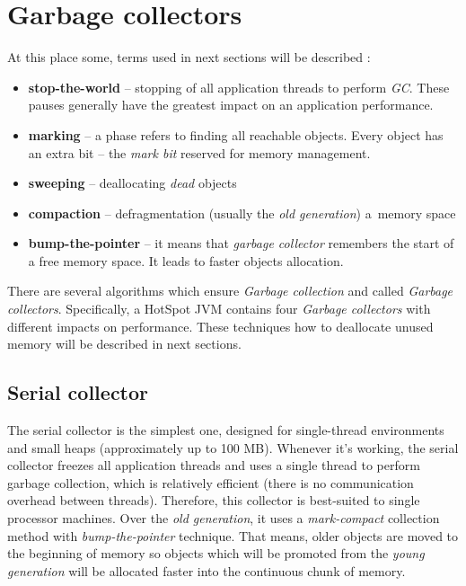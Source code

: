 \documentclass[
  digital, %
  oneside,
  notable, %
  nolof,     %
  nolot     %
]{fithesis3}
\begin{document}
\section{Garbage collectors}
At this place some, terms used in next sections will be described \cite{scott} \cite{hunt}:
\begin{itemize}
	\item \textbf{stop-the-world} -- stopping of all application threads to perform \textit{GC}. These pauses generally have the greatest impact on an application performance.
	\item \textbf{marking} -- a phase refers to finding all reachable objects. Every object has an extra bit -- the \textit{mark bit} reserved for memory management.
	\item \textbf{sweeping} -- deallocating \textit{dead} objects
	\item \textbf{compaction} -- defragmentation (usually the \textit{old generation}) a~memory space
	\item \textbf{bump-the-pointer} -- it means that \textit{garbage collector} remembers the start of a free memory space. It leads to faster objects allocation.
\end{itemize}

There are several algorithms which ensure \textit{Garbage collection} and called \textit{Garbage collectors}. Specifically, a HotSpot JVM contains four \textit{Garbage collectors} with different impacts on performance. These techniques how to deallocate unused memory will be described in next sections.

\subsection{Serial collector}
The serial collector is the simplest one, designed for single-thread environments and small heaps (approximately up to 100 MB). Whenever it's working, the serial collector freezes all application threads and uses a single thread to perform garbage collection, which is relatively efficient (there is no communication overhead between threads). Therefore, this collector is best-suited to single processor machines. Over the \textit{old generation}, it uses a \textit{mark-compact} collection method with \textit{bump-the-pointer} technique. That means, older objects are moved to the beginning of memory so objects which will be promoted from the \textit{young generation} will be allocated faster into the continuous chunk of memory.~\cite{gctuning}~\cite{hunt}
\end{document}
